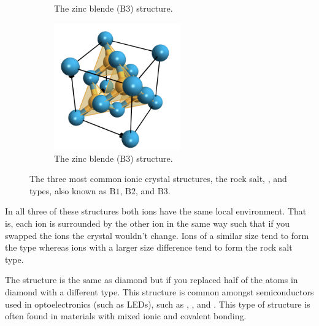 \documentclass[fleqn]{NotesClass}
\begin{document}
\begin{figure}
\begin{subfigure}{0.6\textwidth}
            \caption{The zinc blende (\(\mathrm{B3}\)) structure.}
        \end{subfigure}
        \begin{subfigure}{0.6\textwidth}
            \centering
            \includegraphics[width=0.6\textwidth]{images/ZnS2.pdf}
            \caption{The zinc blende (\(\mathrm{B3}\)) structure.}
        \end{subfigure}
        \caption{The three most common ionic crystal structures, the rock salt, , and  types, also known as \(\mathrm{B1}\), \(\mathrm{B2}\), and \(\mathrm{B3}\).}
        \label{fig:common ionic crystal structures}
    \end{figure}
    
    In all three of these structures both ions have the same local environment.
    That is, each ion is surrounded by the other ion in the same way such that if you swapped the ions the crystal wouldn't change.
    Ions of a similar size tend to form the  type whereas ions with a larger size difference tend to form the rock salt type.
    
    The  structure is the same as diamond but if you replaced half of the atoms in diamond with a different type.
    This structure is common amongst semiconductors used in optoelectronics (such as LEDs), such as , , and .
    This type of structure is often found in materials with mixed ionic and covalent bonding.
    
\end{document}

